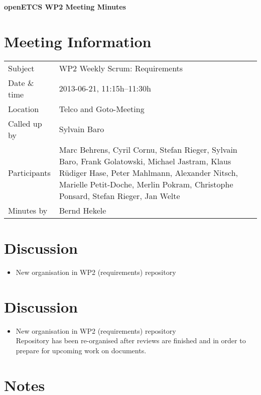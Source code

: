 \documentclass[a4paper, 11pt]{article}
\begin{document}
{\begin{center}\huge\bf openETCS WP2 Meeting Minutes\end{center}}
\section{Meeting Information}

\renewcommand{\arraystretch}{1.5}
\begin{supertabular}{m{.2\textwidth}m{.8\textwidth}}
Subject & WP2 Weekly Scrum: Requirements\\
Date \& time & 2013-06-21, 11:15h--11:30h\\
Location & Telco and Goto-Meeting\\
Called up by & Sylvain Baro\\
Participants &
Marc Behrens,
Cyril Cornu,
Stefan Rieger,
Sylvain Baro,
Frank Golatowski,
Michael Jastram,
Klaus R\"udiger Hase,
Peter Mahlmann,
Alexander Nitsch,
Marielle Petit-Doche,
Merlin Pokram,
Christophe Ponsard,
Stefan Rieger,
Jan Welte
\\

Minutes by & Bernd Hekele\\

\end{supertabular}
\renewcommand{\arraystretch}{1.0}


\section{{Discussion}}

\begin{itemize}
\item New organisation in WP2 (requirements) repository
\end{itemize}

\section{{Discussion}}

\begin{itemize}
\item New organisation in WP2 (requirements) repository\\
Repository has been re-organised after  reviews are finished  and in order to prepare for upcoming work on documents.\\

\end{itemize}

\section{Notes}
\end{document}

